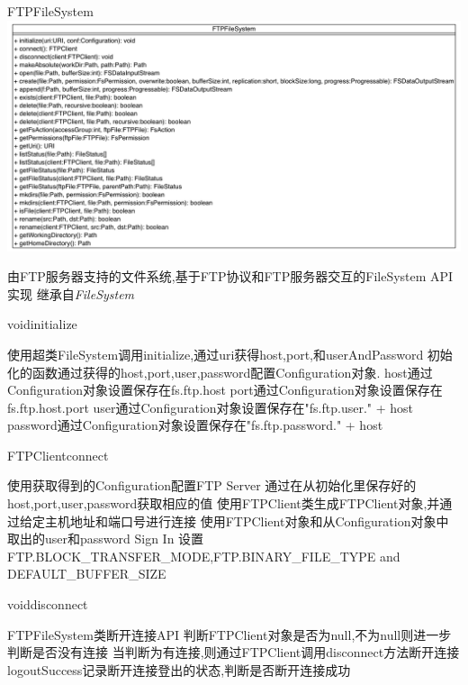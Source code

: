 \begin{XeClass}{FTPFileSystem}
\includegraphics[width=\textwidth]{cdig/FTPFileSystem.png}
     
 由FTP服务器支持的文件系统,基于FTP协议和FTP服务器交互的FileSystem API实现
 继承自\emph{FileSystem}

    \begin{XeMethod}{\XePublic}{void}{initialize}
         
 使用超类FileSystem调用initialize,通过uri获得host,port,和userAndPassword
 初始化的函数通过获得的host,port,user,password配置Configuration对象.
 host通过Configuration对象设置保存在fs.ftp.host
 port通过Configuration对象设置保存在fs.ftp.host.port
 user通过Configuration对象设置保存在"fs.ftp.user." + host
 password通过Configuration对象设置保存在"fs.ftp.password." + host

    \end{XeMethod}

    \begin{XeMethod}{\XePrivate}{FTPClient}{connect}
         
 使用获取得到的Configuration配置FTP Server
 通过在从初始化里保存好的host,port,user,password获取相应的值
 使用FTPClient类生成FTPClient对象,并通过给定主机地址和端口号进行连接
 使用FTPClient对象和从Configuration对象中取出的user和password Sign In
 设置FTP.BLOCK_TRANSFER_MODE,FTP.BINARY_FILE_TYPE and DEFAULT_BUFFER_SIZE

    \end{XeMethod}

    \begin{XeMethod}{\XePrivate}{void}{disconnect}
         
 FTPFileSystem类断开连接API
 判断FTPClient对象是否为null,不为null则进一步判断是否没有连接
 当判断为有连接,则通过FTPClient调用disconnect方法断开连接
 logoutSuccess记录断开连接登出的状态,判断是否断开连接成功


\end{XeMethod}
\end{XeClass}
